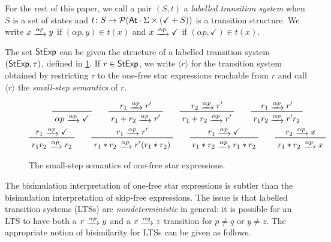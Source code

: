 \documentclass[orivec,envcountsect,envcountsame]{llncs}
\begin{document}
    For the rest of this paper, we call a pair $(S,t)$ a \emph{labelled transition system} when $S$ is a set of states and $t\colon S \to \mathcal P(\mathsf{At}\cdot\Sigma \times (\checkmark + S))$ is a transition structure.
    We write \(x \tr{\alpha p} y\) if \((\alpha p, y) \in t(x)\) and \(x \tr{\alpha p} \checkmark\) if \((\alpha p, \checkmark) \in t(x)\).

    The set \(\mathsf{StExp}\) can be given the structure of a labelled transition system \((\mathsf{StExp}, \tau)\), defined in \cref{fig:small-step stex}.
    If \(r \in \mathsf{StExp}\), we write \(\langle r\rangle\) for the transition system obtained by restricting \(\tau\) to the one-free star expressions reachable from \(r\) and call \(\langle r \rangle\) the \emph{small-step semantics} of \(r\).

    \begin{figure}[!t]
        \begin{gather*}
            \prftree{}{\alpha p \tr{\alpha p} \checkmark}
            \qquad
            \prftree{r_1 \tr{\alpha p} r'}{r_1 + r_2 \tr{\alpha p} r'}
            \qquad
            \prftree{r_2 \tr{\alpha p} r'}{r_1 + r_2 \tr{\alpha p} r'}
            \qquad
            \prftree{r_1 \tr{\alpha p} r'}{r_1r_2 \tr{\alpha p} r'r_2}
            \\
            \prftree{r_1 \tr{\alpha p} \checkmark}{r_1r_2 \tr{\alpha p} r_2}
            \qquad
            \prftree{r_1 \tr{\alpha p} r'}{r_1 * r_2 \tr{\alpha p} r'(r_1 * r_2)}
            \qquad
            \prftree{r_1 \tr{\alpha p} \checkmark}{r_1 * r_2 \tr{\alpha p} r_1 * r_2}
            \qquad
            \prftree{r_2 \tr{\alpha p} x}{r_1 * r_2 \tr{\alpha p} x}
        \end{gather*}
        \caption{\label{fig:small-step stex}The small-step semantics of one-free star expressions.}
    \end{figure}

    The bisimulation interpretation of one-free star expressions is subtler than the bisimulation interpretation of skip-free  \GKAT expressions.
    The issue is that labelled transition systems (LTSs) are \emph{nondeterministic} in general: it is possible for an LTS to have both a \(x \tr{\alpha p} y\) and a \(x \tr{\alpha q} z\) transition for \(p \neq q\) or \(y \neq z\).
    The appropriate notion of bisimilarity for LTSs can be given as follows.
\end{document}
